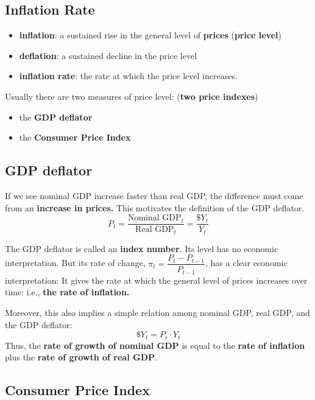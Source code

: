 \documentclass[11pt, a4paper]{ECON2123}
\begin{document}
\begin{spacing}{1.5}
    \section{Inflation Rate}

    \begin{itemize}
        \item {\bf inflation}: a sustained rise in the general level of {\bf prices} 
        ({\bf price level})
        \item {\bf deflation}: a sustained decline in the price level
        \item {\bf inflation rate}: the rate at which the price level increases.
    \end{itemize}

    Usually there are two measures of price level: ({\bf two price indexes})
    \begin{itemize}
        \item the {\bf GDP deflator}
        \item the {\bf Consumer Price Index}
    \end{itemize}

    \subsection{GDP deflator}

    If we see nominal GDP increase faster than real GDP, the difference 
    must come from an {\bf increase in prices.} This motivates the 
    definition of the GDP deflator.
    $$P_t=\frac{\text{Nominal GDP}_t}{\text{Real GDP}_t}=\frac{\$ Y_t}{Y_t}$$

    The GDP deflator is called an {\bf index number}. Its level has no economic 
    interpretation. But its rate of change, $\pi_t=\dfrac{P_t-P_{t-1}}{P_{t-1}}$, 
    has a clear economic interpretation: It gives the rate at which the general 
    level of prices increases over time: i.e., {\bf the rate of inflation.}

    Moreover, this also implies a simple relation among nominal GDP, 
    real GDP, and the GDP deflator:
    $$\$Y_t = P_t\cdot Y_t$$
    Thus, the {\bf rate of growth of nominal GDP} is equal to the 
    {\bf rate of inflation} plus the {\bf rate of growth of real GDP}.

    \subsection{Consumer Price Index}


\end{spacing}
\end{document}
